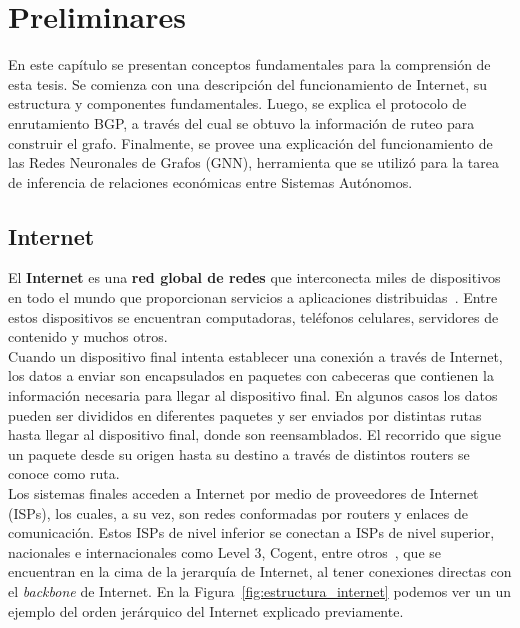﻿\chapter{Preliminares}

En este capítulo se presentan conceptos fundamentales para la comprensión de esta tesis.
Se comienza con una descripción del funcionamiento de Internet, su estructura y componentes fundamentales. Luego, se explica el protocolo de enrutamiento BGP, a través del cual se obtuvo la información de ruteo para construir el grafo.
Finalmente, se provee una explicación del funcionamiento de las Redes Neuronales de Grafos (GNN), herramienta que se utilizó para la tarea de inferencia de relaciones económicas entre Sistemas Autónomos.\\


\section{Internet} \label{internet_section}

El \textbf{Internet} es una \textbf{red global de redes} que interconecta miles de dispositivos en todo el mundo que proporcionan servicios a aplicaciones distribuidas~\cite{Computer-Networking}. Entre estos dispositivos se encuentran computadoras, teléfonos celulares, servidores de contenido y muchos otros.\\

Cuando un dispositivo final intenta establecer una conexión a través de Internet, los datos a enviar son encapsulados en paquetes con cabeceras que contienen la información necesaria para llegar al dispositivo final.
En algunos casos los datos pueden ser divididos en diferentes paquetes y ser enviados por distintas rutas hasta llegar al dispositivo final, donde son reensamblados. 
El recorrido que sigue un paquete desde su origen hasta su destino a través de distintos routers se conoce como ruta. \\


Los sistemas finales acceden a Internet por medio de proveedores de Internet (ISPs), los cuales, a su vez, son redes conformadas por routers y enlaces de comunicación. 
Estos ISPs de nivel inferior se conectan a ISPs de nivel superior, nacionales e internacionales como Level 3, Cogent, entre otros~\cite{ASRank-web}, que se encuentran en la cima de la jerarquía de Internet, al tener conexiones directas con el \textit{backbone} de Internet. En la Figura~\ref{fig:estructura_internet} podemos ver un un ejemplo del orden jerárquico del Internet explicado previamente. \\


